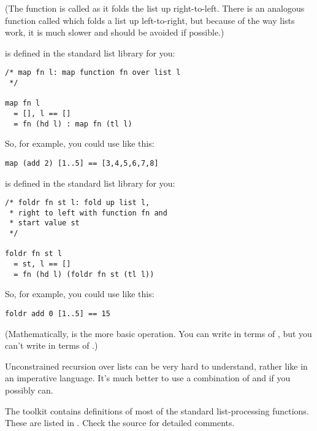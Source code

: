 \noindent
(The function is called  as it folds the list up right-to-left.
There is an analogous function called  which folds a list up
left-to-right, but because of the way lists work, it is much slower and should
be avoided if possible.)

 is defined in the standard list library for you:

\begin{verbatim}
/* map fn l: map function fn over list l
 */

map fn l
  = [], l == []
  = fn (hd l) : map fn (tl l) 
\end{verbatim}

\noindent
So, for example, you could use  like this:

\begin{verbatim}
map (add 2) [1..5] == [3,4,5,6,7,8]
\end{verbatim}

 is defined in the standard list library for you:

\begin{verbatim}
/* foldr fn st l: fold up list l, 
 * right to left with function fn and 
 * start value st
 */
 
foldr fn st l
  = st, l == []
  = fn (hd l) (foldr fn st (tl l)) 
\end{verbatim}

\noindent
So, for example, you could use  like this:

\begin{verbatim}
foldr add 0 [1..5] == 15
\end{verbatim}

\noindent
(Mathematically,  is the more basic operation. You can write
 in terms of , but you can't write  in terms of
.)

Unconstrained recursion over lists can be very hard to understand, rather like
 in an imperative language. It's much better to use a combination of
 and  if you possibly can.

The toolkit  contains definitions of most of the standard
list-processing functions. These are listed in . Check the
source for detailed comments.

